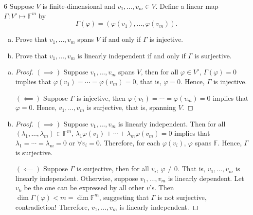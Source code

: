 \documentclass{article}
\newenvironment{problem}[1]{\begin{prob*}{#1}{}}{\end{prob*}}
\begin{document}
\begin{problem}{6}
Suppose $V$ is finite-dimensional and $v_1, \ldots , v_m \in V$. Define a linear map $\Gamma : V' \mapsto \mathbb{F}^{m}$ by \[
	\Gamma(\varphi) = (\varphi(v_1), \ldots , \varphi(v_m)).\]
\begin{enumerate}[(a)]
	\item Prove that $v_1, \ldots , v_m$ spans $V$ if and only if $\Gamma$ is injective.
	\item Prove that $v_1, \ldots , v_m$ is linearly independent if and only if $\Gamma$ is surjective.
\end{enumerate}
\end{problem}
\begin{enumerate}[(a)]
	\item \begin{proof}
		      $(\implies)$ Suppose $v_1, \ldots, v_m$ spans $V$, then for all $\varphi \in V'$, $\Gamma(\varphi) = 0$ implies that $\varphi(v_1) = \cdots = \varphi(v_m) = 0$, that is, $\varphi = 0$. Hence, $\Gamma$ is injective. \par
		      $(\impliedby)$ Suppose $\Gamma$ is injective, then $\varphi(v_1) = \cdots = \varphi(v_m) = 0$ implies that $\varphi = 0$. Hence, $v_1, \ldots , v_m$ is surjective, that is, spanning $V$.
	      \end{proof}
	\item \begin{proof}
		      $(\implies)$ Suppose $v_1, \ldots , v_m$ is linearly independent. Then for all $(\lambda_1, \ldots , \lambda_m) \in \mathbb{F}^m$, $\lambda_1\varphi(v_1) + \cdots + \lambda_m\varphi(v_m) = 0$ implies that $\lambda_1 = \cdots = \lambda_m = 0$ or $\forall v_i = 0$. Therefore, for each $\varphi(v_i)$, $\varphi$ spans $\mathbb{F}$. Hence, $\Gamma$ is surjective. \par
		      $(\impliedby)$ Suppose $\Gamma$ is surjective, then for all $v_i$, $\varphi \neq 0.$ That is, $v_1, \ldots , v_m$ is linearly independent. Otherwise, suppose $v_1, \ldots ,v_m$ is linearly dependent. Let $v_k$ be the one can be expressed by all other $v$'s. Then $\operatorname{dim}\Gamma(\varphi) < m = \operatorname{dim} \mathbb{F}^m$, suggesting that $\Gamma$ is not surjective, contradiction! Therefore, $v_1, \ldots ,v_m$ is linearly independent.
	      \end{proof}
\end{enumerate}
\end{document}
